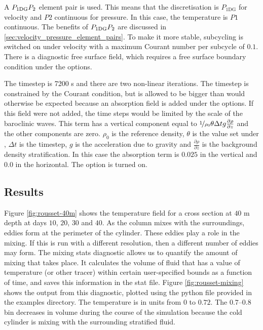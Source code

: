 A $P_{1\mathrm{DG}}P_2$ element pair is used. This means that the discretisation is $P_{1\mathrm{DG}}$ for velocity and  $P2$ continuous for pressure. In this case, the temperature is $P1$ continuous. The benefits of $P_{1\mathrm{DG}}P_2$ are discussed in \ref{sec:velocity_pressure_element_pairs}.  To make it more stable, subcycling is switched on under velocity with a maximum Courant number per subcycle of $0.1$. There is a diagnostic free surface field, which requires a free surface boundary condition under the  options.

The timestep is 7200 s and there are two non-linear iterations.  The timestep is constrained by the Courant condition, but is allowed to be bigger than would otherwise be expected because an absorption field is added under the  options.  If this field were not added, the time steps would be limited by the scale of the baroclinic waves.  This term has a vertical component equal to  ${\nicefrac{1}{\rho_0}} {\theta} {\Delta} {t} {g} {\frac{\partial \rho}{\partial z}}$ and the other components are zero. $\rho_0$ is the reference density, $\theta$ is the value set under , ${\Delta} {t} $ is the timestep, $g$ is the acceleration due to gravity and $\frac{\partial \rho}{\partial z}$ is the background density stratification.   In this case the absorption term is $0.025$ in the vertical and $0.0$ in the horizontal. The  option is turned on. 

\subsection{Results}

Figure \ref{fig:rousset-40m} shows the temperature field for a cross section at $40$ m depth at days $10$, $20$, $30$ and $40$. As the column mixes with the surroundings, eddies form at the perimeter of the cylinder. These eddies play a role in the mixing. If this is run with a different resolution, then a different number of eddies may form. The mixing stats diagnostic allows us to quantify the amount of mixing that takes place. It calculates the volume of fluid that has a value of temperature (or other tracer) within certain user-specified bounds as a function of time, and saves this information in the stat file. Figure \ref{fig:rousset-mixing} shows the output from this diagnostic, plotted using the python file provided in the examples directory. The temperature is in units from $0$ to $0.72$. The $0.7$--$0.8$ bin decreases in volume during the course of the simulation because the cold cylinder is mixing with the surrounding stratified fluid.


